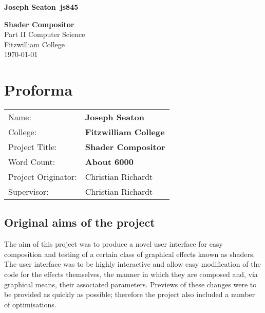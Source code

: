 \documentclass[12pt,twoside,notitlepage]{report}
\begin{document}


\newcommand{\name}{Joseph Seaton}
\newcommand{\college}{Fitzwilliam College}
\newcommand{\ptitle}{Shader Compositor}

\setcounter{page}{1}
\pagestyle{plain}



\pagestyle{empty}

\hfill{\LARGE \bf \name ~js845}

\vspace*{60mm}
\begin{center}
\Huge
{\bf \ptitle} \\
\vspace*{5mm}
Part II Computer Science \\
\vspace*{5mm}
\college \\
\vspace*{5mm}
\today  %
\end{center}

\cleardoublepage




\chapter*{Proforma}

{\large
\begin{tabular}{@{\hspace{0em}}ll}
Name:               & \bf \name    \\
College:            & \bf \college \\
Project Title:      & \bf \ptitle  \\
Word Count:         & \bf About 6000 \\
Project Originator: & Christian Richardt                    \\
Supervisor:         & Christian Richardt                    \\ 
\end{tabular}
}


\section*{Original aims of the project}
The aim of this project was to produce a novel user interface for easy composition and testing of a certain class of graphical effects known as shaders. The user interface was to be highly interactive and allow easy modification of the code for the effects themselves, the manner in which they are composed and, via graphical means, their associated parameters. Previews of these changes were to be provided as quickly as possible; therefore the project also included a number of optimisations.
\end{document}
